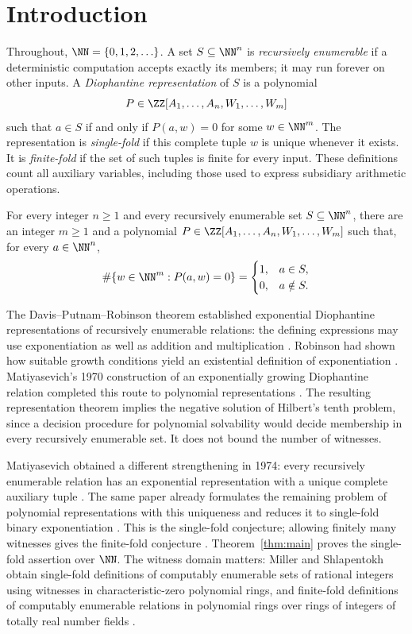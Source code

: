 \section{Introduction}
Throughout, $\NN=\{0,1,2,\ldots\}$. A set $S\subseteq\NN^n$ is
\emph{recursively enumerable} if a deterministic computation accepts exactly
its members; it may run forever on other inputs. A \emph{Diophantine
representation} of $S$ is a polynomial
\[
 P\in\ZZ[A_1,\ldots,A_n,W_1,\ldots,W_m]
\]
such that $a\in S$ if and only if $P(a,w)=0$ for some $w\in\NN^m$.
The representation is \emph{single-fold} if this complete tuple $w$ is unique
whenever it exists. It is \emph{finite-fold} if the set of such tuples is finite
for every input. These definitions count all auxiliary variables, including
those used to express subsidiary arithmetic operations.

\begin{theorem}\label{thm:main}
For every integer $n\ge1$ and every recursively enumerable set
$S\subseteq\NN^n$, there are an integer $m\ge1$ and a polynomial
$P\in\ZZ[A_1,\ldots,A_n,W_1,\ldots,W_m]$ such that, for every $a\in\NN^n$,
\[
 \#\{w\in\NN^m:P(a,w)=0\}=
 \begin{cases}1,&a\in S,\\0,&a\notin S.\end{cases}
\]
\end{theorem}

The Davis--Putnam--Robinson theorem established exponential Diophantine
representations of recursively enumerable relations: the defining expressions
may use exponentiation as well as addition and multiplication
\cite[Section~1]{dpr1961}. Robinson had shown how suitable growth conditions
yield an existential definition of exponentiation
\cite[Section~3]{robinson1952}. Matiyasevich's 1970 construction of an
exponentially growing Diophantine relation completed this route to polynomial
representations \cite[Sections~1 and~3]{mati1970}. The resulting representation
theorem implies the negative solution of Hilbert's tenth problem, since a
decision procedure for polynomial solvability would decide membership in every
recursively enumerable set. It does not bound the number of witnesses.

Matiyasevich obtained a different strengthening in 1974: every recursively
enumerable relation has an exponential representation with a unique complete
auxiliary tuple \cite[Section~2, Main Theorem]{mati1974}. The same paper
already formulates the remaining problem of polynomial representations with
this uniqueness and reduces it to single-fold binary exponentiation
\cite[Section~1]{mati1974}. This is the single-fold conjecture; allowing
finitely many witnesses gives the finite-fold conjecture \cite{mati2010}.
Theorem~\ref{thm:main} proves the single-fold assertion over $\NN$.
The witness domain matters: Miller and Shlapentokh obtain single-fold
definitions of computably enumerable sets of rational integers using
witnesses in characteristic-zero polynomial rings, and finite-fold definitions
of computably enumerable relations in polynomial rings over rings of
integers of totally real number fields \cite{millershlapentokh2022}.

